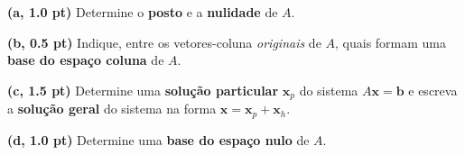 \documentclass[12pt, addpoints]{exam}
\begin{document}
\begin{questions}
\textbf{(a, 1.0 pt)} Determine o \textbf{posto} e a \textbf{nulidade} de $A$.

\textbf{(b, 0.5 pt)} Indique, entre os vetores-coluna \emph{originais} de $A$, quais formam uma \textbf{base do espaço coluna} de $A$.

\textbf{(c, 1.5 pt)} Determine uma \textbf{solução particular} $\mathbf{x}_p$ do sistema $A\mathbf{x} = \mathbf{b}$ e escreva a \textbf{solução geral} do sistema na forma $\mathbf{x} = \mathbf{x}_p + \mathbf{x}_h$.

\textbf{(d, 1.0 pt)} Determine uma \textbf{base do espaço nulo} de $A$.

\end{questions}
\end{document}
